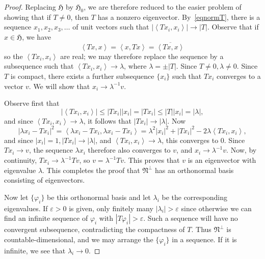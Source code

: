 \documentclass[12pt,reqno]{book}%
\theoremstyle{definition}
\theoremstyle{remark}
\theoremstyle{theorem}
\theoremstyle{remark}
\begin{document}
\begin{proof}
    Replacing $\mathfrak{H}$ by $\mathfrak{H}_0$, we are therefore reduced to the easier problem of showing that if $T \neq 0$, then $T$ has a nonzero eigenvector.
    By~\eqref{eqnormT}, there is a sequence $x_1, x_2, x_3, \ldots $ of unit vectors such that $|{\left\langle Tx_i, x_i\right\rangle}| \to |T|$.
    Observe that if $x \in \mathfrak{H}$, we have
    \[
        {\left\langle T x, x\right\rangle} = {\left\langle x, T x\right\rangle} = \overline{{\left\langle T x, x\right\rangle}}
    \]
    so the ${\left\langle Tx_i, x_i\right\rangle}$ are real; we may therefore replace the sequence by a subsequence such that ${\left\langle Tx_i, x_i\right\rangle} \to \lambda$, where $\lambda = \pm |T|$.
    Since $T \neq 0, \lambda \neq 0$.
    Since $T$ is compact, there exists a further subsequence $\{x_i\}$ such that $Tx_i$ converges to a vector $v$.
    We will show that $x_i \to \lambda^{-1}v$.

    Observe first that
    \[
        |{\left\langle Tx_i, x_i\right\rangle}| \leq |Tx_i| |x_i| = |Tx_i| \leq |T||x_i| = |\lambda|,
    \]
    and since ${\left\langle T x_i, x_i\right\rangle} \to \lambda$, it follows that $|Tx_i| \to |\lambda|$.
    Now
    \[
        |\lambda x_i - Tx_i|^2 = {\left\langle \lambda x_i - T x_i, \lambda x_i - T x_i\right\rangle} = \lambda^2 |x_i|^2 + |Tx_i|^2 - 2\lambda{\left\langle T x_i, x_i\right\rangle},
    \]
    and since $|x_i| = 1, |Tx_i| \to |\lambda|$, and ${\left\langle Tx_i, x_i\right\rangle} \to \lambda$, this converges to 0.
    Since $Tx_i \to v$, the sequence $\lambda x_i$ therefore also converges to $v$, and $x_i \to \lambda^{-1}v$.
    Now, by continuity, $Tx_i \to \lambda^{-1}Tv$, so $v = \lambda^{-1}Tv$.
    This proves that $v$ is an eigenvector with eigenvalue $\lambda$.
    This completes the proof that $\mathfrak{N}^\perp$ has an orthonormal basis consisting of eigenvectors.

    Now let $\{\varphi_i\}$ be this orthonormal basis and let $\lambda_i$ be the corresponding eigenvalues.
    If $\varepsilon > 0$ is given, only finitely many $|\lambda_i| > \varepsilon$ since otherwise we can find an infinite sequence of $\varphi_i$ with $|T\varphi_i| > \varepsilon$.
    Such a sequence will have no convergent subsequence, contradicting the compactness of $T$.
    Thus $\mathfrak{N}^\perp$ is countable-dimensional, and we may arrange the $\{\varphi_i\}$ in a sequence.
    If it is infinite, we see that $\lambda_i \to 0$.
\end{proof}%
\end{document}
